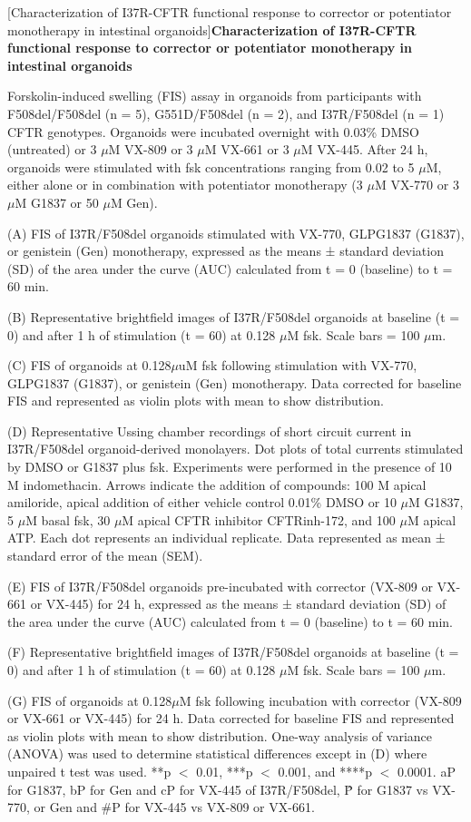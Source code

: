 [Characterization of I37R-CFTR functional response to corrector or potentiator monotherapy in intestinal organoids]{\textbf{Characterization of I37R-CFTR functional response to corrector or potentiator monotherapy in intestinal organoids}}{%
Forskolin-induced swelling (FIS) assay in organoids from participants with F508del/F508del (n = 5), G551D/F508del (n = 2), and I37R/F508del (n = 1) CFTR genotypes. Organoids were incubated overnight with 0.03\% DMSO (untreated) or 3 $\mu$M VX-809 or 3 $\mu$M VX-661 or 3 $\mu$M VX-445. After 24 h, organoids were stimulated with fsk concentrations ranging from 0.02 to 5 $\mu$M, either alone or in combination with potentiator monotherapy (3 $\mu$M VX-770 or 3 $\mu$M G1837 or 50 $\mu$M Gen).

(A) FIS of I37R/F508del organoids stimulated with VX-770, GLPG1837 (G1837), or genistein (Gen) monotherapy, expressed as the means ± standard deviation (SD) of the area under the curve (AUC) calculated from t = 0 (baseline) to t = 60 min.

(B) Representative brightfield images of I37R/F508del organoids at baseline (t = 0) and after 1 h of stimulation (t = 60) at 0.128 $\mu$M fsk. Scale bars = 100 $\mu$m.

(C) FIS of organoids at 0.128$\mu$uM fsk following stimulation with VX-770, GLPG1837 (G1837), or genistein (Gen) monotherapy. Data corrected for baseline FIS and represented as violin plots with mean to show distribution.

(D) Representative Ussing chamber recordings of short circuit current in I37R/F508del organoid-derived monolayers. Dot plots of total currents stimulated by DMSO or G1837 plus fsk. Experiments were performed in the presence of 10 M indomethacin. Arrows indicate the addition of compounds: 100 M apical amiloride, apical addition of either vehicle control 0.01\% DMSO or 10 $\mu$M G1837, 5 $\mu$M basal fsk, 30 $\mu$M apical CFTR inhibitor CFTRinh-172, and 100 $\mu$M apical ATP. Each dot represents an individual replicate. Data represented as mean ± standard error of the mean (SEM).

(E) FIS of I37R/F508del organoids pre-incubated with corrector (VX-809 or VX-661 or VX-445) for 24 h, expressed as the means ± standard deviation (SD) of the area under the curve (AUC) calculated from t = 0 (baseline) to t = 60 min.

(F) Representative brightfield images of I37R/F508del organoids at baseline (t = 0) and after 1 h of stimulation (t = 60) at 0.128 $\mu$M fsk. Scale bars = 100 $\mu$m.

(G) FIS of organoids at 0.128$\mu$M fsk following incubation with corrector (VX-809 or VX-661 or VX-445) for 24 h. Data corrected for baseline FIS and represented as violin plots with mean to show distribution. One-way analysis of variance (ANOVA) was used to determine statistical differences except in (D) where unpaired t test was used. **p $<$ 0.01, ***p $<$ 0.001, and ****p $<$ 0.0001. aP for G1837, bP for Gen and cP for VX-445 of I37R/F508del, \^P for G1837 vs VX-770, or Gen and \#P for VX-445 vs VX-809 or VX-661.
}

